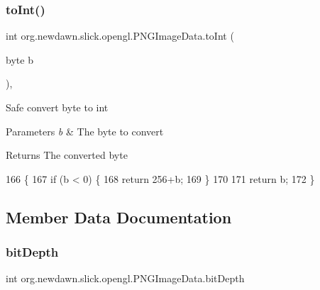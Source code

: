 \subsubsection{\texorpdfstring{to\+Int()}{toInt()}}
{\footnotesize\ttfamily int org.\+newdawn.\+slick.\+opengl.\+P\+N\+G\+Image\+Data.\+to\+Int (\begin{DoxyParamCaption}\item[{byte}]{b }\end{DoxyParamCaption})\hspace{0.3cm}{\ttfamily [inline]}, {\ttfamily [private]}}

Safe convert byte to int


\begin{DoxyParams}{Parameters}
{\em b} & The byte to convert \\
\hline
\end{DoxyParams}
\begin{DoxyReturn}{Returns}
The converted byte 
\end{DoxyReturn}

\begin{DoxyCode}
166                               \{
167         \textcolor{keywordflow}{if} (b < 0) \{
168             \textcolor{keywordflow}{return} 256+b;
169         \}
170         
171         \textcolor{keywordflow}{return} b;
172     \}
\end{DoxyCode}


\subsection{Member Data Documentation}
\mbox{\label{classorg_1_1newdawn_1_1slick_1_1opengl_1_1_p_n_g_image_data_adcf8b9e32837d9853842349385a37c22}} 
\subsubsection{\texorpdfstring{bit\+Depth}{bitDepth}}
{\footnotesize\ttfamily int org.\+newdawn.\+slick.\+opengl.\+P\+N\+G\+Image\+Data.\+bit\+Depth\hspace{0.3cm}{\ttfamily [private]}}

